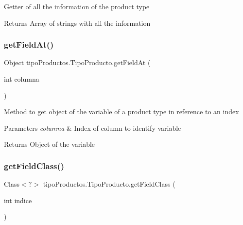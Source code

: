 Getter of all the information of the product type

\begin{DoxyReturn}{Returns}
Array of strings with all the information 
\end{DoxyReturn}
\mbox{\label{classtipo_productos_1_1_tipo_producto_a6e1ecdc3c8d5f65c0859485418e14cd6}} 
\subsubsection{\texorpdfstring{get\+Field\+At()}{getFieldAt()}}
{\footnotesize\ttfamily Object tipo\+Productos.\+Tipo\+Producto.\+get\+Field\+At (\begin{DoxyParamCaption}\item[{int}]{columna }\end{DoxyParamCaption})\hspace{0.3cm}{\ttfamily [inline]}}

Method to get object of the variable of a product type in reference to an index


\begin{DoxyParams}{Parameters}
{\em columna} & Index of column to identify variable \\
\hline
\end{DoxyParams}
\begin{DoxyReturn}{Returns}
Object of the variable 
\end{DoxyReturn}
\mbox{\label{classtipo_productos_1_1_tipo_producto_acf09300124ea0bcf0ff83000d18a95dc}} 
\subsubsection{\texorpdfstring{get\+Field\+Class()}{getFieldClass()}}
{\footnotesize\ttfamily Class$<$?$>$ tipo\+Productos.\+Tipo\+Producto.\+get\+Field\+Class (\begin{DoxyParamCaption}\item[{int}]{indice }\end{DoxyParamCaption})\hspace{0.3cm}{\ttfamily [inline]}}

